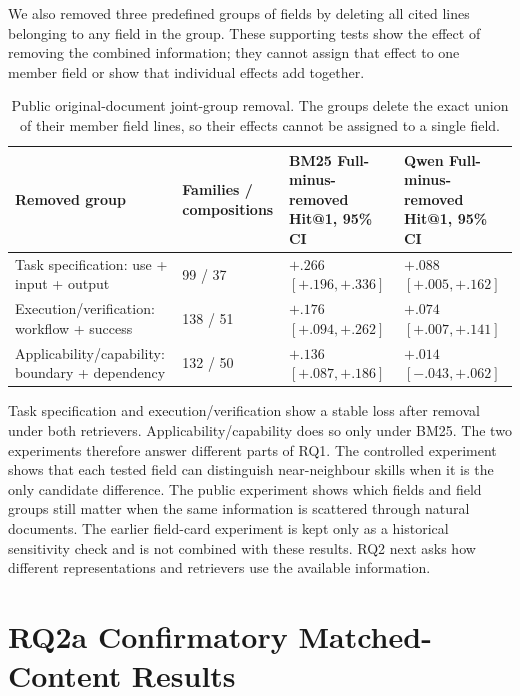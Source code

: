 We also removed three predefined groups of fields by deleting all cited lines belonging to any field in the group. These supporting tests show the effect of removing the combined information; they cannot assign that effect to one member field or show that individual effects add together.

\begin{table}[H]
\centering
\scriptsize
\setlength{\tabcolsep}{3pt}
\begin{tabular}{p{}p{}p{}p{}}
\toprule
Removed group & Families / compositions & BM25 Full-minus-removed Hit@1, 95\% CI & Qwen Full-minus-removed Hit@1, 95\% CI \\
\midrule
Task specification: use + input + output & 99 / 37 & $+.266$ $[+.196,+.336]$ & $+.088$ $[+.005,+.162]$ \\
Execution/verification: workflow + success & 138 / 51 & $+.176$ $[+.094,+.262]$ & $+.074$ $[+.007,+.141]$ \\
Applicability/capability: boundary + dependency & 132 / 50 & $+.136$ $[+.087,+.186]$ & $+.014$ $[-.043,+.062]$ \\
\bottomrule
\end{tabular}
\caption{Public original-document joint-group removal. The groups delete the exact union of their member field lines, so their effects cannot be assigned to a single field.}
\label{tab:rq1-public-original-joint-removal}
\end{table}

Task specification and execution/verification show a stable loss after removal under both retrievers. Applicability/capability does so only under BM25. The two experiments therefore answer different parts of RQ1. The controlled experiment shows that each tested field can distinguish near-neighbour skills when it is the only candidate difference. The public experiment shows which fields and field groups still matter when the same information is scattered through natural documents. The earlier field-card experiment is kept only as a historical sensitivity check and is not combined with these results. RQ2 next asks how different representations and retrievers use the available information.

\section{RQ2a Confirmatory Matched-Content Results}
\label{sec:rq2a-confirmatory-results}

